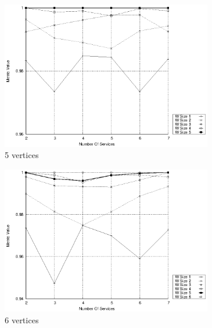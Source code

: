 \begin{figure}[h]
\begin{subfigure}{0.33\textwidth}
    \includegraphics[width=\textwidth]{Images/graphs/window_quality_performance_diff_qual_n7_s7_50_80_n5}
    \caption{5 vertices}
    \label{fig:quality_window_average_qualitative_n5}
  \end{subfigure}
  \hfill
  \begin{subfigure}{0.33\textwidth}
    \includegraphics[width=\textwidth]{Images/graphs/window_quality_performance_diff_qual_n7_s7_50_80_n6}
    \caption{6 vertices}
    \label{fig:quality_window_average_qualitative_n6}
  \end{subfigure}
  \begin{subfigure}{0.33\textwidth}

\end{subfigure}
\end{figure}
